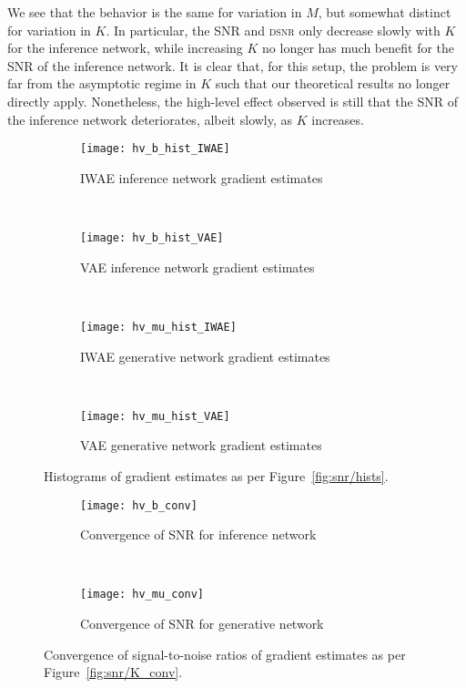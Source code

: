 We see that the behavior is the
same for variation in $M$, but somewhat distinct for variation in $K$.  
In particular, the \gls{SNR} and \textsc{dsnr} only decrease slowly with $K$ for the inference network, while increasing $K$ no longer has much benefit for the \gls{SNR} of the
inference network.
It is clear that, for this
setup, the problem is very far from the asymptotic regime in $K$ such that our theoretical results no
longer directly apply.  Nonetheless, the high-level effect observed is still that the \gls{SNR} of 
the inference
network deteriorates, albeit slowly, as $K$ increases.

\begin{figure}[h]
	\centering
	\begin{subfigure}[b]{0.45\textwidth}
		\centering
		\texttt{[image: hv\_b\_hist\_IWAE]}
		\caption{\gls{IWAE} inference network gradient estimates \label{fig:hv/b_hist_iwae}}
	\end{subfigure} ~~~~~~~~~~
	\begin{subfigure}[b]{0.45\textwidth}
		\centering
		\texttt{[image: hv\_b\_hist\_VAE]}
		\caption{\gls{VAE} inference network gradient estimates \label{fig:hv/b_hist_vae}}
	\end{subfigure}\\
	\begin{subfigure}[b]{0.45\textwidth}
		\centering
		\texttt{[image: hv\_mu\_hist\_IWAE]}
		\caption{\gls{IWAE} generative network gradient estimates \label{fig:hv/mu_hist_iwae}}
	\end{subfigure} ~~~~~~~~~~
	\begin{subfigure}[b]{0.45\textwidth}
		\centering
		\texttt{[image: hv\_mu\_hist\_VAE]}
		\caption{\gls{VAE} generative network gradient estimates \label{fig:hv/mu_hist_vae}}
	\end{subfigure}
	\caption{Histograms of gradient estimates as per Figure~\ref{fig:snr/hists}.
		\label{fig:hv/hists}
	\vspace{-4pt}}
\end{figure}

\begin{figure}[h]
	\centering
	\begin{subfigure}[b]{0.45\textwidth}
		\centering
		\texttt{[image: hv\_b\_conv]}
		\caption{Convergence of \gls{SNR} for inference network \label{fig:hv/b}}
	\end{subfigure} ~~~~~~~~~~
	\begin{subfigure}[b]{0.45\textwidth}
		\centering
		\texttt{[image: hv\_mu\_conv]}
		\caption{Convergence of \gls{SNR} for generative network\label{fig:hv/mu}}
	\end{subfigure}
	\caption{Convergence of signal-to-noise ratios of gradient estimates
		as per Figure~\ref{fig:snr/K_conv}.
		\label{fig:hv/K_conv}}
\end{figure}


